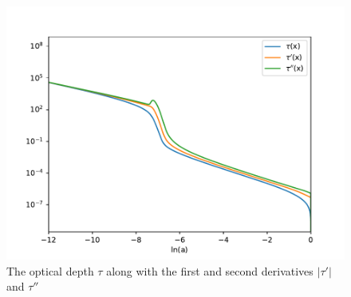 \documentclass{aa}
\begin{document}
\begin{figure}[h!]
   \includegraphics[scale=0.5]{Figures/milestone_2/tautilde.pdf}
   \caption{The optical depth $\tau$ along with the first and second derivatives $|\tau'|$ and $\tau''$}
    \label{fig:M2_tautilde}
\end{figure}
\end{document}
